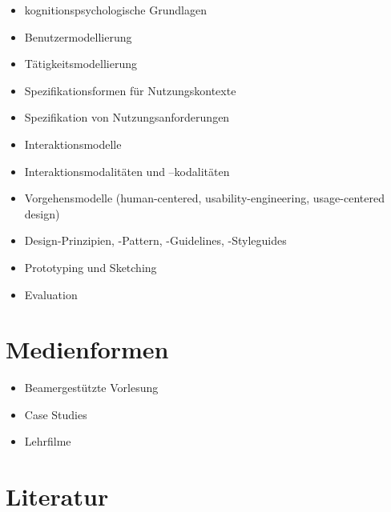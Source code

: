 \begin{itemize}
\tightlist
\item
  kognitionspsychologische Grundlagen
\item
  Benutzermodellierung
\item
  Tätigkeitsmodellierung
\item
  Spezifikationsformen für Nutzungskontexte
\item
  Spezifikation von Nutzungsanforderungen
\item
  Interaktionsmodelle
\item
  Interaktionsmodalitäten und --kodalitäten
\item
  Vorgehensmodelle (human-centered, usability-engineering,
  usage-centered design)
\item
  Design-Prinzipien, -Pattern, -Guidelines, -Styleguides
\item
  Prototyping und Sketching
\item
  Evaluation
\end{itemize}

\hypertarget{medienformenpathlabelmi-2017modulbeschreibungen-bachelorba_mensch-computer_interaktion}{%
\section*{Medienformen\label{/mi-2017/modulbeschreibungen-bachelor/BA_Mensch-Computer_Interaktion}}\label{medienformenpathlabelmi-2017modulbeschreibungen-bachelorba_mensch-computer_interaktion}}

\begin{itemize}
\tightlist
\item
  Beamergestützte Vorlesung
\item
  Case Studies
\item
  Lehrfilme
\end{itemize}

\hypertarget{literaturpathlabelmi-2017modulbeschreibungen-bachelorba_mensch-computer_interaktion}{%
\section*{Literatur\label{/mi-2017/modulbeschreibungen-bachelor/BA_Mensch-Computer_Interaktion}}\label{literaturpathlabelmi-2017modulbeschreibungen-bachelorba_mensch-computer_interaktion}}

